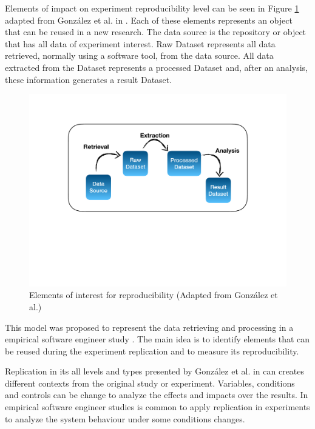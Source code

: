 Elements of impact on experiment reproducibility level can be seen in Figure \ref{grafico:elements} adapted from González et al. in \cite{exp05}. Each of these elements represents an object that can be reused in a new research. The data source is the repository or object that has all data of experiment interest. Raw Dataset represents all data retrieved, normally using a software tool, from the data source. All data extracted from the Dataset represents a processed Dataset and, after an analysis, these information generates a result Dataset.

\begin{figure}[h]
	\begin{center}
		\includegraphics[scale=.35]{diagrama01.pdf}
		\caption{Elements of interest for reproducibility (Adapted from González et al.)}
		\label{grafico:elements}
	\end{center}
\end{figure}

This model was proposed to represent the data retrieving and processing in a empirical software engineer study \cite{exp05}. The main idea is to identify elements that can be reused during the experiment replication and to measure its reproducibility.

Replication in its all levels and types presented by González et al. in \cite{exp03} can creates different contexts from the original study or experiment. Variables, conditions and controls can be change to analyze the effects and impacts over the results. In empirical software engineer studies is common to apply replication in experiments to analyze the system behaviour under some conditions changes.

